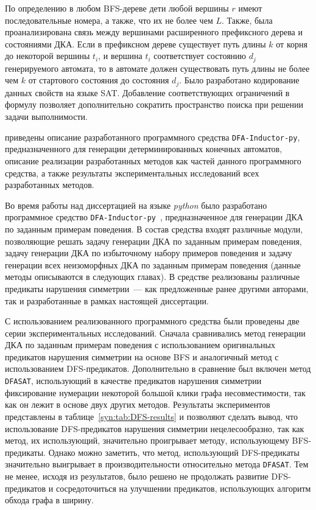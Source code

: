 По определению в любом BFS-дереве дети любой вершины $r$ имеют последовательные номера, а также, что их не более чем $L$.
Также, была проанализирована связь между вершинами расширенного префиксного дерева и состояниями ДКА.
Если в префиксном дереве существует путь длины $k$ от корня до некоторой вершины $t_{i}$, и вершина $t_{i}$ соответствует состоянию $d_{j}$ генерируемого автомата, то в автомате должен существовать путь длины не более чем $k$ от стартового состояния до состояния $d_{j}$.
Было разработано кодирование данных свойств на языке SAT.
Добавление соответствующих ограничений в формулу позволяет дополнительно сократить пространство поиска при решении задачи выполнимости.

\insection{\ref{sec:space:results}} приведены описание разработанного программного средства \texttt{DFA-Inductor-py}, предназначенного для генерации детерминированных конечных автоматов, описание реализации разработанных методов как частей данного программного средства, а также результаты экспериментальных исследований всех разработанных методов. 

Во время работы над диссертацией на языке \emph{python} было разработано программное средство \texttt{DFA-Inductor-py}~\cite{dfa-inductor-py}, предназначенное для генерации ДКА по заданным примерам поведения.
В состав средства входят различные модули, позволяющие решать задачу генерации ДКА по заданным примерам поведения, задачу генерации ДКА по избыточному набору примеров поведения и задачу генерации всех неизоморфных ДКА по заданным примерам поведения (данные методы описываются в следующих главах).
В средстве реализованы различные предикаты нарушения симметрии~--- как предложенные ранее другими авторами, так и разработанные в рамках настоящей диссертации.

С использованием реализованного программного средства были проведены две серии экспериментальных исследований.
Сначала сравнивались метод генерации ДКА по заданным примерам поведения с использованием оригинальных предикатов нарушения симметрии на основе BFS и аналогичный метод с использованием DFS-предикатов.
Дополнительно в сравнение был включен метод \texttt{DFASAT}, использующий в качестве предикатов нарушения симметрии фиксирование нумерации некоторой большой клики графа несовместимости, так как он лежит в основе двух других методов. 
Результаты экспериментов представлены в таблице~\ref{syn:tab:DFS-results} и позволяют сделать вывод, что использование DFS-предикатов нарушения симметрии нецелесообразно, так как метод, их использующий, значительно проигрывает методу, использующему BFS-предикаты.
Однако можно заметить, что метод, использующий DFS-предикаты значительно выигрывает в производительности относительно метода \texttt{DFASAT}.
Тем не менее, исходя из результатов, было решено не продолжать развитие DFS-предикатов и сосредоточиться на улучшении предикатов, использующих алгоритм обхода графа в ширину.

